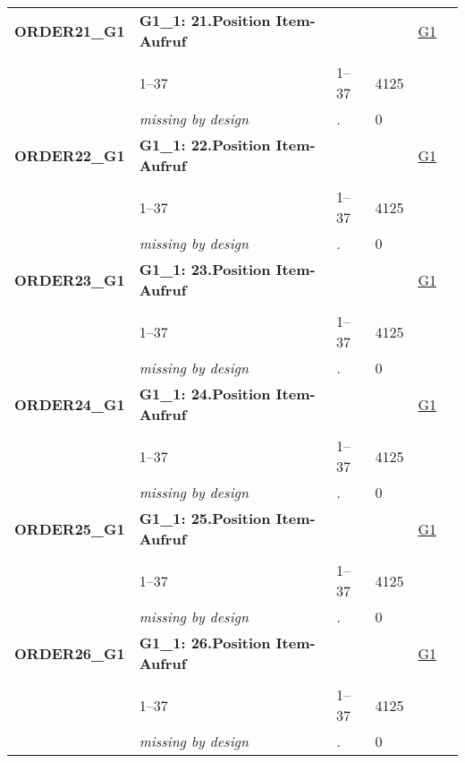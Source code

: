 \begin{longtable}{| L{2.45cm} | L{6cm} | C{1.5cm} | R{1cm} | C{2.25cm} | C{2.25cm} |}
   \midrule
\textbf{ORDER21\_G1}\label{var:ORDER21:G1} & \textbf{G1\_1: 21.Position Item-Aufruf} &  &  & \hyperref[G1]{G1} & \hyperref[var:suf:]{} \\ 
   &  &  &  &  &  \\ 
   & 1--37 & 1--37 & 4125 &  &  \\ 
   & \textit{missing by design} & \textit{.} & 0 &  &  \\ 
   \midrule
\textbf{ORDER22\_G1}\label{var:ORDER22:G1} & \textbf{G1\_1: 22.Position Item-Aufruf} &  &  & \hyperref[G1]{G1} & \hyperref[var:suf:]{} \\ 
   &  &  &  &  &  \\ 
   & 1--37 & 1--37 & 4125 &  &  \\ 
   & \textit{missing by design} & \textit{.} & 0 &  &  \\ 
   \midrule
\textbf{ORDER23\_G1}\label{var:ORDER23:G1} & \textbf{G1\_1: 23.Position Item-Aufruf} &  &  & \hyperref[G1]{G1} & \hyperref[var:suf:]{} \\ 
   &  &  &  &  &  \\ 
   & 1--37 & 1--37 & 4125 &  &  \\ 
   & \textit{missing by design} & \textit{.} & 0 &  &  \\ 
   \midrule
\textbf{ORDER24\_G1}\label{var:ORDER24:G1} & \textbf{G1\_1: 24.Position Item-Aufruf} &  &  & \hyperref[G1]{G1} & \hyperref[var:suf:]{} \\ 
   &  &  &  &  &  \\ 
   & 1--37 & 1--37 & 4125 &  &  \\ 
   & \textit{missing by design} & \textit{.} & 0 &  &  \\ 
   \midrule
\textbf{ORDER25\_G1}\label{var:ORDER25:G1} & \textbf{G1\_1: 25.Position Item-Aufruf} &  &  & \hyperref[G1]{G1} & \hyperref[var:suf:]{} \\ 
   &  &  &  &  &  \\ 
   & 1--37 & 1--37 & 4125 &  &  \\ 
   & \textit{missing by design} & \textit{.} & 0 &  &  \\ 
   \midrule
\textbf{ORDER26\_G1}\label{var:ORDER26:G1} & \textbf{G1\_1: 26.Position Item-Aufruf} &  &  & \hyperref[G1]{G1} & \hyperref[var:suf:]{} \\ 
   &  &  &  &  &  \\ 
   & 1--37 & 1--37 & 4125 &  &  \\ 
   & \textit{missing by design} & \textit{.} & 0 &  &  \\ 

\end{longtable}
